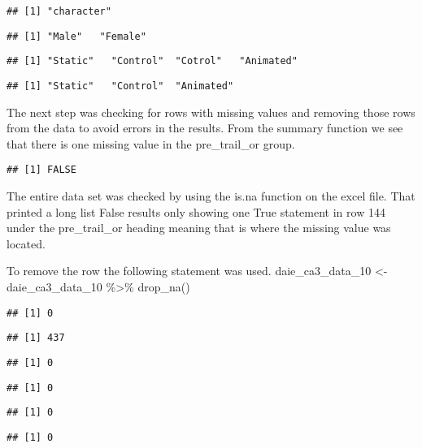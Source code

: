 \documentclass[
]{article}
\begin{document}
\begin{verbatim}
## [1] "character"
\end{verbatim}

\begin{verbatim}
## [1] "Male"   "Female"
\end{verbatim}

\begin{verbatim}
## [1] "Static"   "Control"  "Cotrol"   "Animated"
\end{verbatim}

\begin{verbatim}
## [1] "Static"   "Control"  "Animated"
\end{verbatim}

The next step was checking for rows with missing values and removing
those rows from the data to avoid errors in the results. From the
summary function we see that there is one missing value in the
pre\_trail\_or group.

\begin{verbatim}
## [1] FALSE
\end{verbatim}

The entire data set was checked by using the is.na function on the excel
file. That printed a long list False results only showing one True
statement in row 144 under the pre\_trail\_or heading meaning that is
where the missing value was located.

To remove the row the following statement was used. daie\_ca3\_data\_10
\textless-daie\_ca3\_data\_10 \%\textgreater\% drop\_na()

\begin{verbatim}
## [1] 0
\end{verbatim}

\begin{verbatim}
## [1] 437
\end{verbatim}

\begin{verbatim}
## [1] 0
\end{verbatim}

\begin{verbatim}
## [1] 0
\end{verbatim}

\begin{verbatim}
## [1] 0
\end{verbatim}

\begin{verbatim}
## [1] 0
\end{verbatim}
\end{document}
